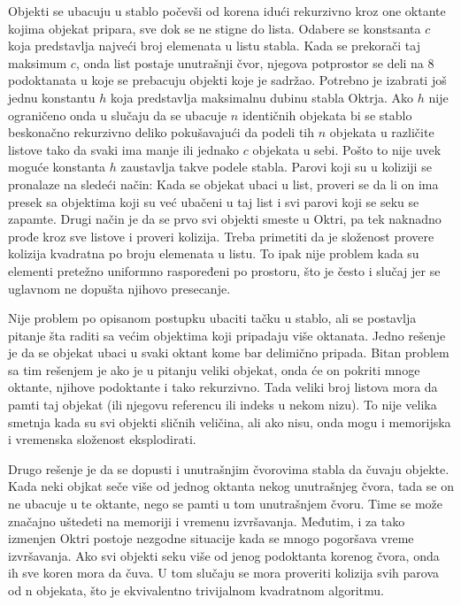 \documentclass[12pt,oneside]{memoir}
\begin{document}
Objekti se ubacuju u stablo počevši od korena idući rekurzivno kroz one oktante kojima objekat pripara,
sve dok se ne stigne do lista.
Odabere se konstsanta $c$ koja predstavlja najveći broj elemenata u listu stabla. 
Kada se prekorači taj maksimum $c$, onda list postaje unutrašnji čvor, njegova potprostor se deli 
na 8 podoktanata u koje se prebacuju objekti koje je sadržao.
Potrebno je izabrati još jednu konstantu $h$ koja predstavlja maksimalnu dubinu stabla Oktrja.
Ako $h$ nije ograničeno onda u slučaju da se ubacuje $n$ identičnih objekata bi se stablo 
beskonačno rekurzivno deliko pokušavajući da podeli tih $n$ objekata u različite listove 
tako da svaki ima manje ili jednako $c$ objekata u sebi. 
Pošto to nije uvek moguće konstanta $h$ zaustavlja takve podele stabla.
Parovi koji su u koliziji se pronalaze na sledeći način:
Kada se objekat ubaci u list, proveri se da li on ima presek sa objektima koji su već
ubačeni u taj list i svi parovi koji se seku se zapamte.
Drugi način je da se prvo svi objekti smeste u Oktri, pa tek naknadno prođe kroz sve listove 
i proveri kolizija. 
Treba primetiti da je složenost provere kolizija kvadratna po broju elemenata u listu.
To ipak nije problem kada su elementi pretežno uniformno raspoređeni po prostoru, što je često 
i slučaj jer se uglavnom ne dopušta njihovo presecanje. 

Nije problem po opisanom postupku ubaciti tačku u stablo, ali se postavlja pitanje šta raditi sa većim objektima
koji pripadaju više oktanata.
Jedno rešenje je da se objekat ubaci u svaki oktant kome bar delimično pripada. 
Bitan problem sa tim rešenjem je ako je u pitanju veliki objekat, onda će on pokriti mnoge oktante, njihove 
podoktante i tako rekurzivno. Tada veliki broj listova mora da pamti taj objekat (ili njegovu referencu ili indeks u nekom nizu).
To nije velika smetnja kada su svi objekti sličnih veličina, ali ako 
nisu, onda mogu i memorijska i vremenska složenost eksplodirati. 

Drugo rešenje je da se dopusti i unutrašnjim čvorovima stabla da čuvaju objekte.
Kada neki objkat seče više od jednog oktanta nekog unutrašnjeg čvora, tada se on ne ubacuje 
u te oktante, nego se pamti u tom unutrašnjem čvoru. Time se može značajno uštedeti na memoriji i vremenu izvršavanja.
Međutim, i za tako izmenjen Oktri postoje nezgodne situacije kada se mnogo pogoršava vreme izvršavanja.
Ako svi objekti seku više od jenog podoktanta korenog čvora, onda ih sve koren mora da čuva. 
U tom slučaju se mora proveriti kolizija svih parova od n objekata, što je ekvivalentno trivijalnom kvadratnom algoritmu.
\end{document}
